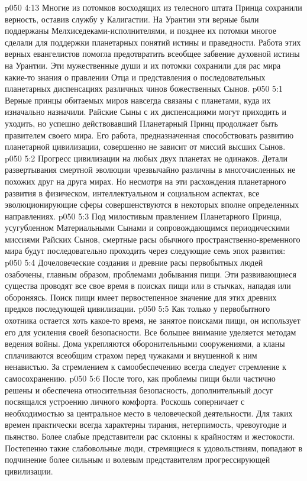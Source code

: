 \vs p050 4:13 Многие из потомков восходящих из телесного штата Принца сохранили верность, оставив службу у Калигастии. На Урантии эти верные были поддержаны Мелхиседеками\hyp{}исполнителями, и позднее их потомки многое сделали для поддержки планетарных понятий истины и праведности. Работа этих верных евангелистов помогла предотвратить всеобщее забвение духовной истины на Урантии. Эти мужественные души и их потомки сохранили для рас мира какие\hyp{}то знания о правлении Отца и представления о последовательных планетарных диспенсациях различных чинов божественных Сынов.
\vs p050 5:1 Верные принцы обитаемых миров навсегда связаны с планетами, куда их изначально назначили. Райские Сыны с их диспенсациями могут приходить и уходить, но успешно действовавший Планетарный Принц продолжает быть правителем своего мира. Его работа, предназначенная способствовать развитию планетарной цивилизации, совершенно не зависит от миссий высших Сынов.
\vs p050 5:2 Прогресс цивилизации на любых двух планетах не одинаков. Детали развертывания смертной эволюции чрезвычайно различны в многочисленных не похожих друг на друга мирах. Но несмотря на эти расхождения планетарного развития в физическом, интеллектуальном и социальном аспектах, все эволюционирующие сферы совершенствуются в некоторых вполне определенных направлениях.
\vs p050 5:3 Под милостивым правлением Планетарного Принца, усугубленном Материальными Сынами и сопровождающимся периодическими миссиями Райских Сынов, смертные расы обычного пространственно\hyp{}временного мира будут последовательно проходить через следующие семь эпох развития:
\vs p050 5:4 \bibnobreakspace {} Дочеловеческие создания и древние расы первобытных людей озабочены, главным образом, проблемами добывания пищи. Эти развивающиеся существа проводят все свое время в поисках пищи или в стычках, нападая или обороняясь. Поиск пищи имеет первостепенное значение для этих древних предков последующей цивилизации.
\vs p050 5:5 \bibnobreakspace {} Как только у первобытного охотника остается хоть какое\hyp{}то время, не занятое поисками пищи, он использует его для усиления своей безопасности. Все большее внимание уделяется методам ведения войны. Дома укрепляются оборонительными сооружениями, а кланы сплачиваются всеобщим страхом перед чужаками и внушенной к ним ненавистью. За стремлением к самообеспечению всегда следует стремление к самосохранению.
\vs p050 5:6 \bibnobreakspace {} После того, как проблемы пищи были частично решены и обеспечена относительная безопасность, дополнительный досуг посвящался устроению личного комфорта. Роскошь соперничает с необходимостью за центральное место в человеческой деятельности. Для таких времен практически всегда характерны тирания, нетерпимость, чревоугодие и пьянство. Более слабые представители рас склонны к крайностям и жестокости. Постепенно такие слабовольные люди, стремящиеся к удовольствиям, попадают в подчинение более сильным и волевым представителям прогрессирующей цивилизации.
